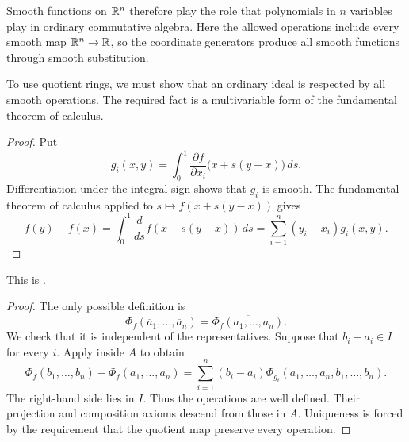 Smooth functions on $\mathbb{R}^n$ therefore play the role that polynomials in $n$
variables play in ordinary commutative algebra. Here the allowed operations
include every smooth map $\mathbb{R}^n\to\mathbb{R}$, so the coordinate generators produce
all smooth functions through smooth substitution.

To use quotient rings, we must show that an ordinary ideal is respected by all
smooth operations. The required fact is a multivariable form of the
fundamental theorem of calculus.


\begin{proof}
  Put
  \[
    g_i(x,y)
    =\int_0^1
      \frac{\partial f}{\partial x_i}\bigl(x+s(y-x)\bigr)\,ds.
  \]
  Differentiation under the integral sign shows that $g_i$ is smooth. The
  fundamental theorem of calculus applied to
  $s\mapsto f(x+s(y-x))$ gives
  \[
    f(y)-f(x)
    =\int_0^1\frac{d}{ds}f(x+s(y-x))\,ds
    =\sum_{i=1}^n(y_i-x_i)g_i(x,y).
  \]
\end{proof}


This is \citet[Chapter~I, Proposition~1.2]{Moerdijk_Reyes_Smooth_Infinitesimal_Analysis}.

\begin{proof}
  The only possible definition is
  \[
    \Phi_f(\overline{a}_1,\ldots,\overline{a}_n)
    =\overline{\Phi_f(a_1,\ldots,a_n)}.
  \]
  We check that it is independent of the representatives. Suppose that
  $b_i-a_i\in I$ for every $i$. Apply  inside $A$ to obtain
  \[
    \Phi_f(b_1,\ldots,b_n)-\Phi_f(a_1,\ldots,a_n)
    =\sum_{i=1}^n(b_i-a_i)
      \Phi_{g_i}(a_1,\ldots,a_n,b_1,\ldots,b_n).
  \]
  The right-hand side lies in $I$. Thus the operations are well defined. Their
  projection and composition axioms descend from those in $A$. Uniqueness is
  forced by the requirement that the quotient map preserve every operation.
\end{proof}

